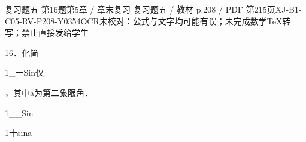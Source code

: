 \begin{bankitem}{复习题五 第16题}{第5章 / 章末复习 复习题五 / 教材 p.208 / PDF 第215页}{XJ-B1-C05-RV-P208-Y0354}{OCR未校对：公式与文字均可能有误；未完成数学TeX转写；禁止直接发给学生}
\begin{ocrdraft}
\par
16．化简
\par
1\_一Sin仅
\par
，其中a为第二象限角．
\par
1\_\_Sin
\par
1十sina
\end{ocrdraft}
\end{bankitem}
